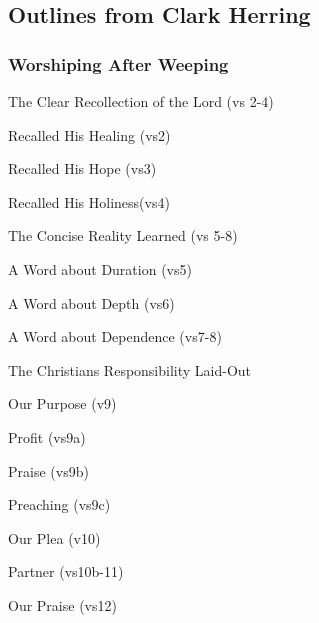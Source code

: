 
\subsection{Outlines from Clark Herring}

\subsubsection{Worshiping After Weeping}



\begin{compactenum}
    \item The Clear Recollection of the Lord (vs 2-4)
    \begin{compactenum}[A.]
        \item Recalled His Healing (vs2)
        \item Recalled His Hope (vs3)
        \item Recalled His Holiness(vs4)
    \end{compactenum}
    \item The Concise Reality Learned (vs 5-8)
    \begin{compactenum}[A.]
        \item A Word about Duration (vs5)
        \item A Word about Depth (vs6)
        \item A Word about Dependence (vs7-8)
    \end{compactenum}
    \item The Christians Responsibility Laid-Out 
    \begin{compactenum}[A.]
        \item Our Purpose (v9)
        \begin{compactenum}[1.]
            \item Profit (vs9a)
            \item Praise (vs9b)
            \item Preaching (vs9c)
        \end{compactenum}
        \item Our Plea (v10)
        \item Partner (vs10b-11)
        \item Our Praise (vs12)
    \end{compactenum}
\end{compactenum}


